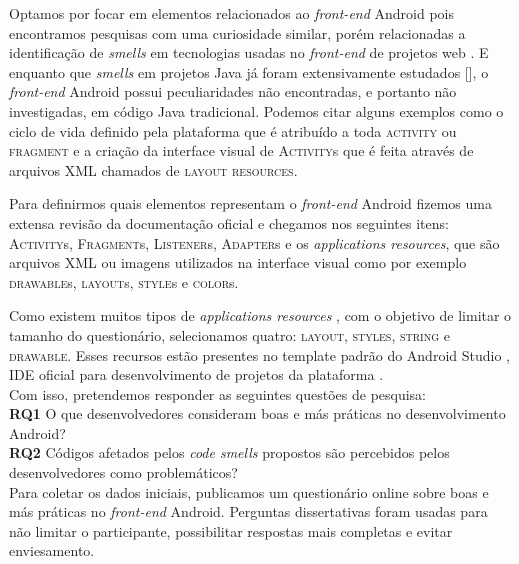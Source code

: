 Optamos por focar em elementos relacionados ao \textit{front-end} Android pois encontramos pesquisas com uma curiosidade similar, por\'em relacionadas a identifica\c{c}\~ao de \textit{smells} em tecnologias usadas no \textit{front-end} de projetos web \cite{CSSCodeSmell, BB, FinavaroAniche2016}. E enquanto que \textit{smells} em projetos Java j\'a foram extensivamente estudados [], o \textit{front-end} Android possui peculiaridades n\~ao encontradas, e portanto n\~ao investigadas, em c\'odigo Java tradicional. Podemos citar alguns exemplos como o ciclo de vida definido pela plataforma que \'e atribu\'ido a toda \textsc{activity} ou \textsc{fragment} e a criação da interface visual de \textsc{Activity}s que \'e feita atrav\'es de arquivos XML chamados de \textsc{layout resources}.

Para definirmos quais elementos representam o \textit{front-end} Android fizemos uma extensa revis\~ao da documenta\c{c}\~ao oficial \cite{AndroidDeveloperSite2016} e chegamos nos seguintes itens: \textsc{Activity}s, \textsc{Fragment}s, \textsc{Listener}s, \textsc{Adapter}s e os \textit{applications resources}, que s\~ao arquivos XML ou imagens utilizados na interface visual como por exemplo \textsc{drawable}s, \textsc{layout}s, \textsc{style}s e \textsc{color}s.

Como existem muitos tipos de \textit{applications resources} \cite{AndroidResourcesOverview}, com o objetivo de limitar o tamanho do question\'ario, selecionamos quatro: \textsc{layout}, \textsc{styles}, \textsc{string} e \textsc{drawable}. Esses recursos est\~ao presentes no template padr\~ao do Android Studio \cite{FirstApp2017}, IDE oficial para desenvolvimento de projetos da plataforma \cite{AndroidStudio}. \\

Com isso, pretendemos responder as seguintes quest\~oes de pesquisa: \\

\textbf{RQ1} O que desenvolvedores consideram boas e m\'as pr\'aticas no desenvolvimento Android? \\

\textbf{RQ2} C\'odigos afetados pelos \textit{code smells} propostos s\~ao percebidos pelos desenvolvedores como problem\'aticos? \\

Para coletar os dados iniciais, publicamos um question\'ario online sobre boas e m\'as pr\'aticas no \textit{front-end} Android. Perguntas dissertativas foram usadas para n\~ao limitar o participante, possibilitar respostas mais completas e evitar enviesamento. 

